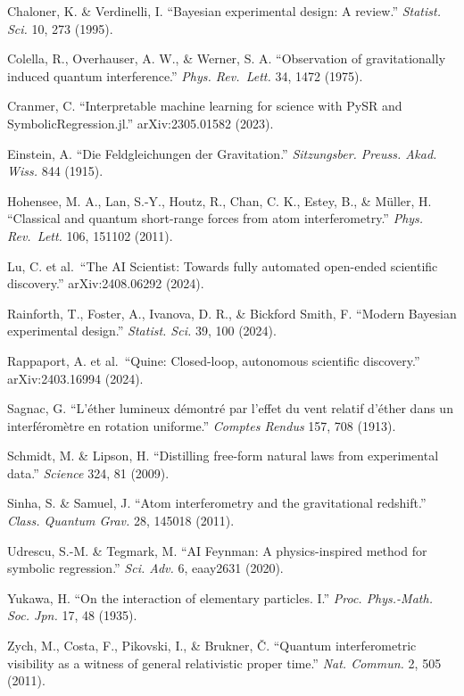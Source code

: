 \documentclass[
]{article}
\begin{document}
Chaloner, K. \& Verdinelli, I. ``Bayesian experimental design: A
review.'' \emph{Statist. Sci.} 10, 273 (1995).

Colella, R., Overhauser, A. W., \& Werner, S. A. ``Observation of
gravitationally induced quantum interference.'' \emph{Phys. Rev.~Lett.}
34, 1472 (1975).

Cranmer, C. ``Interpretable machine learning for science with PySR and
SymbolicRegression.jl.'' arXiv:2305.01582 (2023).

Einstein, A. ``Die Feldgleichungen der Gravitation.'' \emph{Sitzungsber.
Preuss. Akad. Wiss.} 844 (1915).

Hohensee, M. A., Lan, S.-Y., Houtz, R., Chan, C. K., Estey, B., \&
Müller, H. ``Classical and quantum short-range forces from atom
interferometry.'' \emph{Phys. Rev.~Lett.} 106, 151102 (2011).

Lu, C. et al.~``The AI Scientist: Towards fully automated open-ended
scientific discovery.'' arXiv:2408.06292 (2024).

Rainforth, T., Foster, A., Ivanova, D. R., \& Bickford Smith, F.
``Modern Bayesian experimental design.'' \emph{Statist. Sci.} 39, 100
(2024).

Rappaport, A. et al.~``Quine: Closed-loop, autonomous scientific
discovery.'' arXiv:2403.16994 (2024).

Sagnac, G. ``L'éther lumineux démontré par l'effet du vent relatif
d'éther dans un interféromètre en rotation uniforme.'' \emph{Comptes
Rendus} 157, 708 (1913).

Schmidt, M. \& Lipson, H. ``Distilling free-form natural laws from
experimental data.'' \emph{Science} 324, 81 (2009).

Sinha, S. \& Samuel, J. ``Atom interferometry and the gravitational
redshift.'' \emph{Class. Quantum Grav.} 28, 145018 (2011).

Udrescu, S.-M. \& Tegmark, M. ``AI Feynman: A physics-inspired method
for symbolic regression.'' \emph{Sci. Adv.} 6, eaay2631 (2020).

Yukawa, H. ``On the interaction of elementary particles. I.''
\emph{Proc. Phys.-Math. Soc. Jpn.} 17, 48 (1935).

Zych, M., Costa, F., Pikovski, I., \& Brukner, Č. ``Quantum
interferometric visibility as a witness of general relativistic proper
time.'' \emph{Nat. Commun.} 2, 505 (2011).
\end{document}
